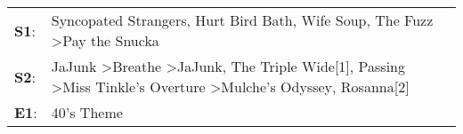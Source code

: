 \begin{supertabular}{p{0.03\textwidth}p{0.92\textwidth}}
 \textbf{S1}:  &                                                                                                                                                        Syncopated Strangers\textsuperscript{}, \enspace Hurt Bird Bath\textsuperscript{}, \enspace Wife Soup\textsuperscript{}, \enspace The Fuzz\textsuperscript{} \textgreater \enspace Pay the Snucka\textsuperscript{}  \enspace  \\
 \textbf{S2}:  &  JaJunk\textsuperscript{} \textgreater \enspace Breathe\textsuperscript{} \textgreater \enspace JaJunk\textsuperscript{}, \enspace The Triple Wide[1]\textsuperscript{}, \enspace Passing\textsuperscript{} \textgreater \enspace Miss Tinkle's Overture\textsuperscript{} \textgreater \enspace Mulche's Odyssey\textsuperscript{}, \enspace Rosanna[2]\textsuperscript{}  \enspace  \\
 \textbf{E1}:  &                                                                                                                                                                                                                                                                                                                                               40's Theme\textsuperscript{}  \enspace  \\
\end{supertabular}
